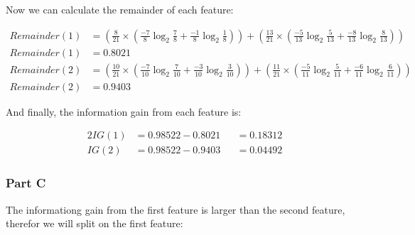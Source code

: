 \documentclass[12pt]{article}
\begin{document}
\noindent
Now we can calculate the remainder of each feature:

\iffalse
(8/21 * ((-7/8) * log_2(7/8) + (-1/8)*log_2(1/8))) + (13/21 * ((-5/13) * log_2(5/13) + (-8/13) log_2(8/13)))
\fi
\begin{center}
    \begin{align*}
        Remainder(1) &= \left( \frac{8}{21} \times \left( \frac{-7}{8} \log_{2}{\frac{7}{8}} + \frac{-1}{8}\log_{2}{\frac{1}{8}} \right) \right) + \left( \frac{13}{21} \times \left( \frac{-5}{13} \log_{2}{\frac{5}{13}} + \frac{-8}{13}\log_{2}{\frac{8}{13}} \right) \right) \\ 
        Remainder(1) &= 0.8021\\
        Remainder(2) &= \left( \frac{10}{21} \times \left( \frac{-7}{10} \log_{2}{\frac{7}{10}} + \frac{-3}{10}\log_{2}{\frac{3}{10}} \right) \right) + \left( \frac{11}{21} \times \left( \frac{-5}{11} \log_{2}{\frac{5}{11}} + \frac{-6}{11}\log_{2}{\frac{6}{11}} \right) \right) \\
        Remainder(2) &= 0.9403
    \end{align*}
\end{center}

\noindent
And finally, the information gain from each feature is:

\begin{center}
    \begin{alignat*}{2}
        IG(1) &= 0.98522 - 0.8021 &&= 0.18312 \\
        IG(2) &= 0.98522 - 0.9403 &&= 0.04492
    \end{alignat*}
\end{center}

\subsubsection{Part C}
\noindent
The informationg gain from the first feature is larger than the second feature, therefor we will split on the first feature: 
\begin{center}
\end{center}
\end{document}
